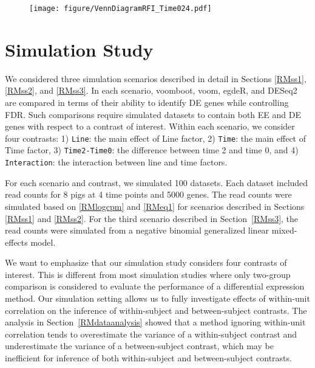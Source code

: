 \begin{figure}[!htbp]
\centering
\texttt{[image: figure/VennDiagramRFI\_Time024.pdf]}
       \label{RMfigkr}
\end{figure}



\section{Simulation Study}\label{RMss}

We considered three simulation scenarios described in detail in Sections \ref{RMss1},  \ref{RMss2},  and \ref{RMss3}. In each scenario, voomboot, voom, egdeR, and DESeq2 are compared in terms of their ability to identify DE genes while controlling FDR. Such comparisons require simulated datasets to contain both EE and DE genes with respect to a contrast of interest.  Within each scenario, we consider four  contrasts: 1) \texttt{Line}: the  main effect of Line factor, 2) \texttt{Time}: the main effect of Time factor, 3) \texttt{Time2-Time0}: the difference between time 2 and time 0, and 4) \texttt{Interaction}: the interaction between line and time factors.

For each scenario and  contrast, we simulated 100 datasets. Each dataset included read counts for 8 pigs at 4 time points and 5000 genes. The read counts were simulated based on \eqref{RMlogcpm} and \eqref{RMeq1} for scenarios described in Sections \ref{RMss1} and \ref{RMss2}. For the third scenario described in Section~\ref{RMss3}, the read counts were simulated from a negative binomial generalized linear mixed-effects model.


We want to emphasize that our simulation study considers four contrasts of interest. This is different from most simulation studies where only two-group comparison is considered to evaluate the performance of a differential expression method.  Our simulation setting allows us to fully investigate effects of within-unit correlation on the inference of within-subject and between-subject contrasts. The analysis in Section~\ref{RMdataanalysis} showed that a method ignoring within-unit correlation tends to overestimate the variance of a within-subject contrast and underestimate the variance of a between-subject contrast, which may be inefficient for inference of both within-subject and between-subject contrasts. 

